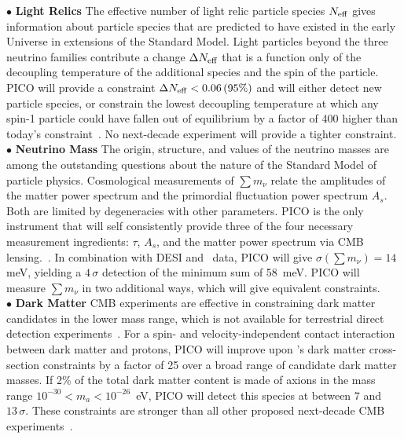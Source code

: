 \documentclass[PICOAPC.tex]{subfiles}
\begin{document}
$\bullet$ {\bf Light Relics} \hspace{0.1in} The effective number of light relic particle species ${N_{\rm eff}}$ gives information about particle species that are predicted to have existed in the early Universe in extensions of the Standard Model. Light particles beyond the three neutrino families contribute a change $\Delta {N_{\rm eff}}$ that is a function only of the decoupling temperature of the additional species and the spin of the particle. PICO will provide a constraint $\Delta {N_{\rm eff}} < 0.06 \, (95\%)$ and will either detect new particle species, or constrain the lowest decoupling temperature at which any spin-1 particle could have fallen out of equilibrium by a factor of 400 higher than today's constraint~\citep{green_swp}. No next-decade experiment will provide a tighter constraint.   \\ 
%
$\bullet$ {\bf Neutrino Mass} \hspace{0.1in} \label{neutrino_fundamental} The origin, structure, and values of the neutrino masses are among the outstanding questions about the nature of the Standard Model of particle physics.  
Cosmological measurements of $\sum m_\nu$ relate the amplitudes of the matter power spectrum and the primordial fluctuation power spectrum $A_s$.  Both are limited by degeneracies with other parameters. PICO is the only instrument that will self consistently provide three of the four necessary measurement ingredients: $\tau$, $A_s$, and the matter power spectrum via CMB lensing.~\citep{green_swp,dvorkin_swp}. 
In combination with DESI and \euclid~data, PICO will give $\sigma(\sum m_\nu) = 14$ meV, yielding a $4\,\sigma$ detection of the minimum sum of 58~meV. PICO will measure  $\sum m_\nu$ in two additional ways, which will give equivalent constraints. \\
%
$\bullet$ {\bf Dark Matter} \hspace{0.1in} \ac{CMB} experiments are effective in constraining dark matter candidates in the lower mass range, which is not available for terrestrial direct detection experiments~\citep{Slatyer2009,Galli2009,Huetsi2009,Huetsi2011,Madhavacheril:2013cna,Green:2018pmd}. 
For a spin- and velocity-independent contact interaction between dark matter and protons, PICO will improve upon \planck 's dark matter cross-section constraints by a factor of 25 over a broad range of candidate dark matter masses. If 2\% of the total dark matter content is made of axions in the mass range $10^{-30} < m_{a} < 10^{-26}$~eV, PICO will detect this species at between $7$ and $13\,\sigma$.  These constraints are stronger than all other proposed next-decade CMB experiments~\citep{gluscevic_swp}. \\
\end{document}
